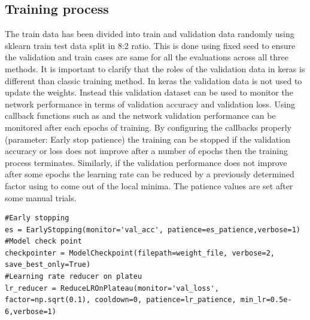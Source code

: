 \subsection{Training process}
The train data has been divided into train and validation data randomly using sklearn train test data split \cite{sklearnsplit} in 8:2 ratio. This is done using fixed seed to ensure the validation and train cases are 
same for all the evaluations across all three methods. It is important to clarify that the roles of the validation data in keras 
is different than classic training method. In keras the validation data is not used to update the weights. Instead this validation dataset can be used to monitor the network performance in terms of 
validation accuracy and validation loss. Using callback functions such as  and  \cite{kerascallbacks} the network validation performance can be monitored after each epochs of training.
By configuring the callbacks properly (parameter: Early stop patience) the training can be stopped if the validation accuracy or loss does not improve after a number of epochs then the training process terminates.
Similarly, if the validation performance does not improve after some epochs the learning rate can be reduced by a previously determined factor using  to come out of the local minima. The patience values 
are set after some manual trials. \\

\begin{lstlisting}
#Early stopping
es = EarlyStopping(monitor='val_acc', patience=es_patience,verbose=1)
#Model check point
checkpointer = ModelCheckpoint(filepath=weight_file, verbose=2, save_best_only=True) 
#Learning rate reducer on plateu
lr_reducer = ReduceLROnPlateau(monitor='val_loss', factor=np.sqrt(0.1), cooldown=0, patience=lr_patience, min_lr=0.5e-6,verbose=1)
\end{lstlisting}


